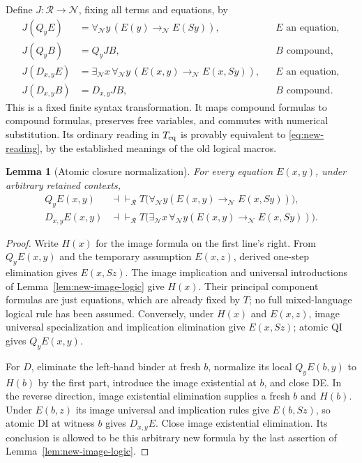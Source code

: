 \documentclass[11pt,a4paper]{article}
\newtheorem{lemma}[theorem]{Lemma}
\theoremstyle{definition}\newtheorem{definition}[theorem]{Definition}
\begin{document}
Define $J:\mathcal R\to\mathcal N$, fixing all terms and equations, by
\begin{equation}
 \begin{aligned}
 J(Q_yE)&=\forall_{\mathcal N}y\,
                (E(y)\to_{\mathcal N}E(Sy)),
                    &&E\text{ an equation},\\
 J(Q_yB)&=Q_yJB,     &&B\text{ compound},\\
 J(D_{x,y}E)&=\exists_{\mathcal N}x\,
             \forall_{\mathcal N}y\,
                (E(x,y)\to_{\mathcal N}E(x,Sy)),
                    &&E\text{ an equation},\\
 J(D_{x,y}B)&=D_{x,y}JB,&&B\text{ compound}.
 \end{aligned}
 \label{eq:new-J}
\end{equation}
This is a fixed finite syntax transformation.  It maps compound formulas to
compound formulas, preserves free variables, and commutes with numerical
substitution.  Its ordinary reading in $T_{\rm eq}$ is provably equivalent to
\eqref{eq:new-reading}, by the established meanings of the old logical macros.

\begin{lemma}[Atomic closure normalization]
\label{lem:new-atomic-normalization}
For every equation $E(x,y)$, under arbitrary retained contexts,
\begin{equation}
 \begin{aligned}
 Q_yE(x,y)&\dashv\vdash_{\mathcal R}
       T\bigl(\forall_{\mathcal N}y
           (E(x,y)\to_{\mathcal N}E(x,Sy))\bigr),\\
 D_{x,y}E(x,y)&\dashv\vdash_{\mathcal R}
       T\bigl(\exists_{\mathcal N}x\,
             \forall_{\mathcal N}y
           (E(x,y)\to_{\mathcal N}E(x,Sy))\bigr).
 \end{aligned}
 \label{eq:new-atomic-normalization}
\end{equation}
\end{lemma}
\begin{proof}
Write $H(x)$ for the image formula on the first line's right.
From $Q_yE(x,y)$ and the temporary assumption $E(x,z)$, derived one-step
elimination gives $E(x,Sz)$.  The image implication and universal
introductions of Lemma~\ref{lem:new-image-logic} give $H(x)$.  Their
principal component formulas are just equations, which are already fixed
by $T$; no full mixed-language logical rule has been assumed.
Conversely, under $H(x)$ and $E(x,z)$, image universal specialization and
implication elimination give $E(x,Sz)$; atomic QI gives $Q_yE(x,y)$.

For $D$, eliminate the left-hand binder at fresh $b$, normalize its local
$Q_yE(b,y)$ to $H(b)$ by the first part, introduce the image existential
at $b$, and close DE.  In the reverse direction, image existential
elimination supplies a fresh $b$ and $H(b)$.  Under $E(b,z)$ its image
universal and implication rules give $E(b,Sz)$, so atomic DI at witness
$b$ gives $D_{x,y}E$.  Close image existential elimination.  Its conclusion
is allowed to be this arbitrary new formula by the last assertion of
Lemma~\ref{lem:new-image-logic}.
\end{proof}
\end{document}
